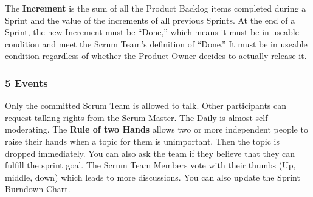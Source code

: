 The \textbf{Increment} is the sum of all the Product Backlog items completed during a Sprint and the value of the increments of all previous Sprints. At the end of a Sprint, the new Increment must be “Done,” which means it must be in useable condition and meet the Scrum Team’s definition of “Done.” It must be in useable condition regardless of whether the Product Owner decides to actually release it.

\subsubsection{5 Events}

\newline\newline Only the committed Scrum Team is allowed to talk. Other participants can request talking rights from the Scrum Master. The Daily is almost self moderating. The \textbf{Rule of two Hands} allows two or more independent people to raise their hands when a topic for them is unimportant. Then the topic is dropped immediately. You can also ask the team if they believe that they can fulfill the sprint goal. The Scrum Team Members vote with their thumbs (Up, middle, down) which leads to more discussions. You can also update the Sprint Burndown Chart.\newline

